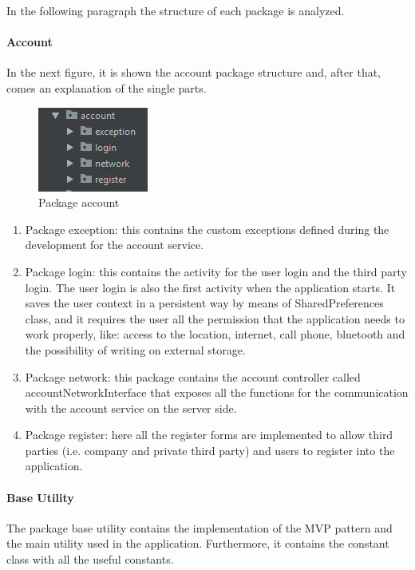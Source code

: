 In the following paragraph the structure of each package is analyzed.

\paragraph{Account}
In the next figure, it is shown the account package structure and, after that, comes an explanation of the single parts.
  
\begin{figure}[H]
\includegraphics[width=0.6\linewidth ]{images/PackageAccount.png}
\caption{ Package account}
\label{fig:pkgsharedata}
\end{figure}

\begin{enumerate}
\item Package exception: this contains the custom exceptions defined during the development for the account service.
\item Package login: this contains the activity for the user login and the third party login. 
The user login is also the first activity when the application starts. 
It saves the user context in a persistent way by means of SharedPreferences class, and it requires the user all the permission that the
application needs to work properly, like: access to the location, internet, call phone, bluetooth and the possibility of writing on external
storage.
\item Package network: this package contains the account controller called accountNetworkInterface that exposes all the functions for the
communication with the account service on the server side.
\item Package register: here all the register forms are implemented to allow third parties (i.e. company and private third party) and
users to register into the application. 
\end{enumerate}

\paragraph{Base Utility}
The package base utility contains the implementation of the MVP pattern and the main utility used in the application. 
Furthermore, it contains the constant class with all the useful constants.

